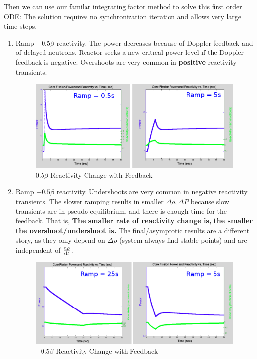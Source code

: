 \documentclass{school-22.211-notes}
\begin{document}
Then we can use our familar integrating factor method to solve this first order ODE: 
The solution requires no synchronization iteration and allows very large time steps. 






\clearpage
{}
\begin{enumerate}
\item Ramp $+0.5\beta$ reactivity. The power decreases because of Doppler feedback and of delayed neutrons. Reactor seeks a new critical power level if the Doppler feedback is negative. Overshoots are very common in \textbf{positive} reactivity transients. 

\begin{figure}[ht]
  \centering
  \includegraphics[width=6in]{images/pke/fn5.png}
  \caption{$0.5 \beta$ Reactivity Change with Feedback}
\end{figure}

\item Ramp $-0.5\beta$ reactivity. Undershoots are very common in negative reactivity transients. The slower ramping results in smaller $\Delta \rho, \Delta P$ because slow transients are in pseudo-equilibrium, and there is enough time for the feedback. That is, \textbf{The smaller rate of reactivity change is, the smaller the overshoot/undershoot is.} The final/asymptotic results are a different story, as they only depend on $\Delta \rho$ (system always find stable points) and are independent of $\frac{\mathrm{d}\rho}{\mathrm{d}t}$. 

\begin{figure}[ht]
  \centering
  \includegraphics[width=6in]{images/pke/fn6.png}
  \caption{$-0.5 \beta$ Reactivity Change with Feedback}
\end{figure}


\end{enumerate}
\end{document}
